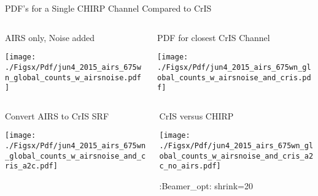 \documentclass[10pt,t]{beamer}
\begin{document}
\begin{frame}[label={sec:org8aa10bf}]{PDF's for a Single CHIRP Channel Compared to CrIS}
\vspace{-0.35in}
\begin{columns}
\begin{column}{0.55\columnwidth}
\begin{block}{\footnotesize AIRS only, Noise added}
\vspace{-0.05in}
\vspace{-0.05in}
\begin{center}
\texttt{[image: ./Figsx/Pdf/jun4\_2015\_airs\_675wn\_global\_counts\_w\_airsnoise.pdf]}
\end{center}
\end{block}
\end{column}

\begin{column}{0.55\columnwidth}
\begin{block}{\footnotesize PDF for closest CrIS Channel}
\vspace{-0.05in}
\vspace{-0.05in}
\begin{center}
\texttt{[image: ./Figsx/Pdf/jun4\_2015\_airs\_675wn\_global\_counts\_w\_airsnoise\_and\_cris.pdf]}
\end{center}
\end{block}
\end{column}
\end{columns}

\vspace{-0.25in}

\begin{columns}
\begin{column}{0.55\columnwidth}
\begin{block}{\footnotesize Convert AIRS to CrIS SRF}
\vspace{-0.05in}
\vspace{-0.05in}
\begin{center}
\texttt{[image: ./Figsx/Pdf/jun4\_2015\_airs\_675wn\_global\_counts\_w\_airsnoise\_and\_cris\_a2c.pdf]}
\end{center}
\end{block}
\end{column}

\begin{column}{0.55\columnwidth}
\begin{block}{\footnotesize CrIS versus CHIRP}
\vspace{-0.05in}
\vspace{-0.05in}
\begin{center}
\texttt{[image: ./Figsx/Pdf/jun4\_2015\_airs\_675wn\_global\_counts\_w\_airsnoise\_and\_cris\_a2c\_no\_airs.pdf]}
\end{center}

:Beamer\_opt: shrink=20
\end{block}
\end{column}
\end{columns}
\end{frame}
\end{document}
